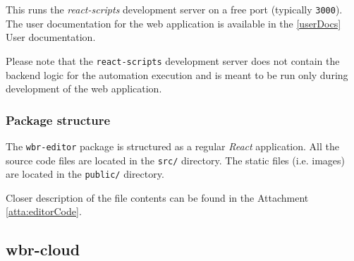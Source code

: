 This runs the \textit{react-scripts} development server on a free port (typically \texttt{3000}).
The user documentation for the web application is available in the \autoref{userDocs} User documentation.

Please note that the \texttt{react-scripts} development server does not contain the backend logic for the automation execution
and is meant to be run only during development of the web application.

\subsubsection{Package structure}

The \texttt{wbr-editor} package is structured as a regular \textit{React} application. 
All the source code files are located in the \texttt{src/} directory.
The static files (i.e. images) are located in the \texttt{public/} directory.

Closer description of the file contents can be found in the Attachment \ref{atta:editorCode}.

\subsection{wbr-cloud}

